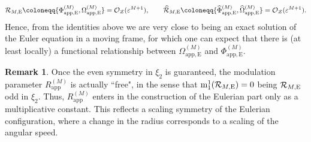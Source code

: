 \documentclass[11pt,reqno,a4paper]{amsart}
\def\eps{\varepsilon}
\newcommand{\cO}{\mathcal{O}}
\newcommand{\cR}{\mathcal{R}}
\newcommand{\cZ}{\mathcal{Z}}
\newcommand{\mrm}{\mathrm{m}}
\newcommand{\1}{\mathbbm{1}}
\theoremstyle{definition}
\newtheorem{remark}[proposition]{Remark}
\theoremstyle{definition}
\numberwithin{equation}{section}
\newcommand{\Mapp}[2]{#1^{(#2)}_\mathrm{app}}
\newcommand{\Mappp}[3]{#1^{(#2)}_\mathrm{app,#3}}
\begin{document}
\begin{align}
    \cR_{M,{\rm E}}\coloneqq\{\Mappp{\Phi}{M}{E},\Mappp{\Omega}{M}{E}\}=\cO_{\cZ}(\eps^{M+1}), \qquad     \widehat{\cR}_{M,{\rm E}}\coloneqq\{\Mappp{\widehat \Phi}{M}{E},\Mappp{\widehat \Omega}{M}{E}\}=\cO_{\cZ}(\eps^{M+1}).
\end{align}
Hence, from the identities above we are very close to being an exact solution of the Euler equation in a moving frame, for which one can expect that there is (at least locally) a functional relationship between $\Mappp{\Omega}{M}{E}$ and $\Mappp{\Phi}{M}{E}$.
\begin{remark}
Once the even symmetry in $\xi_2$ is guaranteed, the modulation parameter $\Mapp{R}{M}$ is actually ``free", in the sense that  $\mrm_{1}^1(\cR_{M,{\rm E}})=0$ being $\cR_{M,{\rm E}}$ odd in $\xi_2$. Thus, $\Mapp{R}{M}$  enters in the construction of the Eulerian part only as a multiplicative constant. This reflects a scaling symmetry of the Eulerian configuration, where a change in the radius corresponds to a scaling of the angular speed.
\end{remark}
\end{document}
